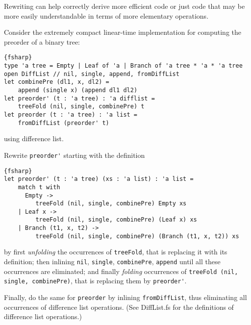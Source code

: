 Rewriting can help correctly derive more efficient code or just code that may be more easily understandable in terms of more elementary operations.

Consider the extremely compact linear-time implementation for computing the preorder of a binary tree:
\begin{lstlisting}{fsharp}
type 'a tree = Empty | Leaf of 'a | Branch of 'a tree * 'a * 'a tree
open DiffList // nil, single, append, fromDiffList
let combinePre (dl1, x, dl2) = 
    append (single x) (append dl1 dl2)
let preorder' (t : 'a tree) : 'a difflist =
    treeFold (nil, single, combinePre) t
let preorder (t : 'a tree) : 'a list = 
    fromDiffList (preorder' t)
\end{lstlisting}
using difference list.

Rewrite \verb|preorder'| starting with the definition
\begin{lstlisting}{fsharp}
let preorder' (t : 'a tree) (xs : 'a list) : 'a list =
    match t with
      Empty -> 
         treeFold (nil, single, combinePre) Empty xs
    | Leaf x -> 
         treeFold (nil, single, combinePre) (Leaf x) xs 
    | Branch (t1, x, t2) -> 
         treeFold (nil, single, combinePre) (Branch (t1, x, t2)) xs 
\end{lstlisting}
by first \emph{unfolding} the occurrences of \verb|treeFold|, that is replacing it with its definition; then inlining \verb|nil|, \verb|single|, \verb|combinePre|, \verb|append| until all these occurrences are eliminated; and finally \emph{folding} occurrences of \verb|treeFold (nil, single, combinePre)|, that is replacing them by \verb|preorder'|. 

Finally, do the same for \verb|preorder| by inlining \verb|fromDiffList|, thus eliminating all occurrences of difference list operations.
(See DiffList.fs for the definitions of difference list operations.) 

